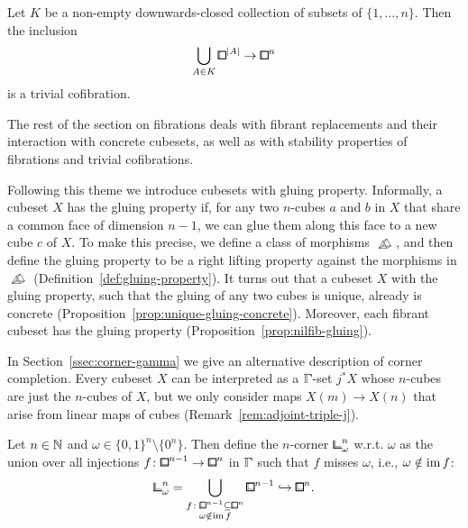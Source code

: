 \begin{proposition*}
Let $K$ be a non-empty downwards-closed collection of subsets of $\{1,\ldots,n\}$.
Then the inclusion
\[
    \bigcup_{A\in K}{\bbox}^{\lvert A\rvert}\to{\bbox}^n
\]
is a trivial cofibration.
\end{proposition*}

The rest of the section on fibrations deals with fibrant replacements
and their interaction with concrete cubesets,
as well as with stability properties of fibrations and trivial cofibrations.

Following this theme we introduce cubesets with gluing property.
Informally, a cubeset $X$ has the gluing property if, for any two $n$-cubes $a$ and $b$ in $X$
that share a common face of dimension $n-1$,
we can glue them along this face to a new cube $c$ of $X$.
To make this precise, we define a class of morphisms $\bprism$,
and then define the gluing property to be a right lifting property against the morphisms in $\bprism$
(Definition~\ref{def:gluing-property}).
It turns out that a cubeset $X$ with the gluing property, such that the gluing of any two cubes is unique, already is concrete (Proposition~\ref{prop:unique-gluing-concrete}).
Moreover, each fibrant cubeset has the gluing property (Proposition~\ref{prop:nilfib-gluing}).

In Section~\ref{ssec:corner-gamma} we give an alternative description of corner completion.
Every cubeset $X$ can be interpreted as a $\bbGamma$-set $j^\ast X$
whose $n$-cubes are just the $n$-cubes of $X$, but we only consider maps $X(m)\to X(n)$
that arise from linear maps of cubes (Remark~\ref{rem:adjoint-triple-j}).

\begin{definition*}
Let $n\in{\mathbb{N}}$ and $\omega\in\{0,1\}^n\setminus\{0^n\}$.
Then define the $n$-corner ${\bbcor}^n_\omega$ w.r.t. $\omega$ as the union over all injections $f\colon{\bblox}^{n-1}\to{\bblox}^n$ in $\bbGamma$
such that $f$ misses $\omega$, i.e., $\omega\notin\operatorname{im} f$:
\[
    {\bbcor}^n_\omega = \bigcup_{\substack{f\colon{\bblox}^{n-1}\sub{\bblox}^n \\ \omega\notin\im f}}{\bblox}^{n-1}\hookrightarrow{\bblox}^n.
\]
\end{definition*}

